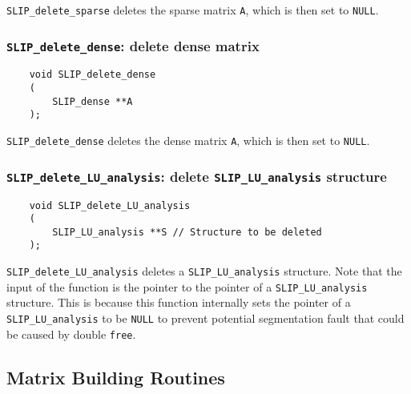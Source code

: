 \documentclass[12pt]{article}
\theoremstyle{definition}
\begin{document}
\verb|SLIP_delete_sparse| deletes the sparse matrix \verb|A|,
which is then set to \verb|NULL|.

\cprotect\subsubsection{\verb|SLIP_delete_dense|: delete dense matrix}
\label{ss:delete_dense}

\begin{mdframed}[userdefinedwidth=6in]
{\footnotesize
\begin{verbatim}
    void SLIP_delete_dense
    (
        SLIP_dense **A
    );
\end{verbatim}
} \end{mdframed}

\verb|SLIP_delete_dense| deletes the dense matrix \verb|A|,
which is then set to \verb|NULL|.

\cprotect\subsubsection{\verb|SLIP_delete_LU_analysis|: delete \verb|SLIP_LU_analysis| structure}
\label{ss:delete_LU_analysis}

\begin{mdframed}[userdefinedwidth=6in]
{\footnotesize
\begin{verbatim}
    void SLIP_delete_LU_analysis
    (
        SLIP_LU_analysis **S // Structure to be deleted
    );
\end{verbatim}
} \end{mdframed}


\verb|SLIP_delete_LU_analysis| deletes a \verb|SLIP_LU_analysis| structure.
Note that the input of the function is the pointer to the pointer of a
\verb|SLIP_LU_analysis| structure. This is because this function internally
sets the pointer of a \verb|SLIP_LU_analysis| to be \verb|NULL| to prevent
potential segmentation fault that could be caused by double \verb|free|.

\subsection{Matrix Building Routines} \label{s:Matrix_building_routines}
\end{document}
